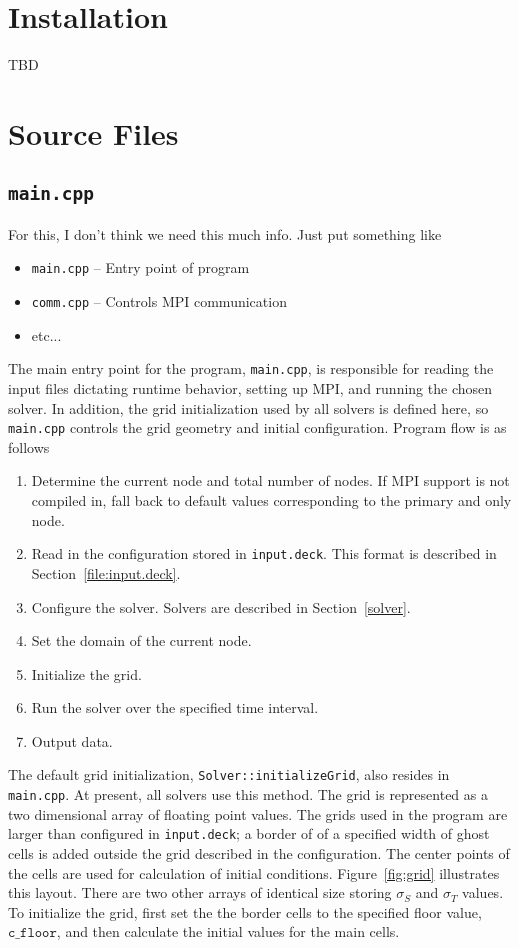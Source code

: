 \documentclass{article}
\newcommand{\main}{\texttt{main.cpp}\xspace}
\newcommand{\inputdeck}{\texttt{input.deck}\xspace}
\newcommand{\floor}{\ensuremath{\mathtt{c\_floor}}\xspace}
\begin{document}
\section{Installation}
TBD

\section{Source Files}
\label{src}
\subsection{\main}
\label{src:main.cpp}
For this, I don't think we need this much info.
Just put something like
\begin{itemize}
\item \texttt{main.cpp} -- Entry point of program
\item \texttt{comm.cpp} -- Controls MPI communication
\item etc...
\end{itemize}


The main entry point for the program, \main, is responsible for reading the input
files dictating runtime behavior, setting up MPI, and running the chosen solver.
In addition, the grid initialization used by all solvers is defined here, so \main
controls the grid geometry and initial configuration. Program flow is as follows
\begin{enumerate}
    \item Determine the current node and total number of nodes. If MPI support is not
    compiled in, fall back to default values corresponding to the primary and
    only node.
    \item Read in the configuration stored in \inputdeck. This format is
    described in Section~\ref{file:input.deck}.
    \item Configure the solver. Solvers are described in Section~\ref{solver}.
    \item Set the domain of the current node.
    \item Initialize the grid.
    \item Run the solver over the specified time interval.
    \item Output data.
\end{enumerate}

The default grid initialization, \texttt{Solver::initializeGrid}, also resides
in \main. At present, all solvers use this
method. The grid is represented as a two dimensional array of floating point values.
The grids used in the program are larger than configured in \inputdeck; a border of
of a specified width of ghost cells is added outside the grid described in the
configuration.  The center points of the cells are used for calculation of
initial conditions. Figure~\ref{fig:grid} illustrates this layout.
There are two other arrays of identical size storing $\sigma_S$ and $\sigma_T$
values. To initialize the grid, first set the the border cells to the
specified floor value, \floor, and then calculate the initial values for the
main cells.
\end{document}
